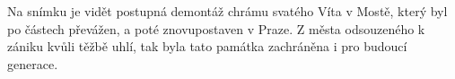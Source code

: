 
Na snímku je vidět postupná demontáž chrámu svatého Víta v Mostě,
který byl po částech převážen, a poté znovupostaven v Praze. Z města
odsouzeného k zániku kvůli těžbě uhlí, tak byla tato památka
zachráněna i pro budoucí generace.

